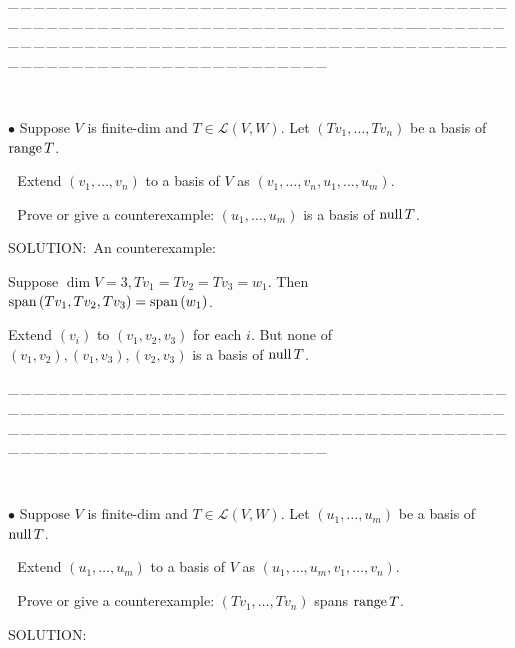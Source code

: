\documentclass[a4paper, 11pt, UTF8]{article}
\def\range{\textup{range}\,}
\def\null{\textup{null\,}}
\def\Spn{\textup{span}\,}
\def\Lm{\mathcal{L}}
\begin{document}
\begin{large}
{\tiny \_\,\_\,\_\,\_\,\_\,\_\,\_\,\_\,\_\,\_\,\_\,\_\,\_\,\_\,\_\,\_\,\_\,\_\,\_\,\_\,\_\,\_\,\_\,\_\,\_\,\_\,\_\,\_\,\_\,\_\,\_\,\_\,\_\,\_\,\_\,\_\,\_\,\_\,\_\,\_\,\_\,\_\,\_\,\_\,\_\,\_\,\_\,\_\,\_\,\_\,\_\,\_\,\_\,\_\,\_\,\_\,\_\,\_\,\_\,\_\,\_\,\_\,\_\,\_\,\_\,\_\,\_\,\_\,\_\,\_\,\_\_\,\_\,\_\,\_\,\_\,\_\,\_\,\_\,\_\,\_\,\_\,\_\,\_\,\_\,\_\,\_\,\_\,\_\,\_\,\_\,\_\,\_\,\_\,\_\,\_\,\_\,\_\,\_\,\_\,\_\,\_\,\_\,\_\,\_\,\_\,\_\,\_\,\_\,\_\,\_\,\_\,\_\,\_\,\_\,\_\,\_\,\_\,\_\,\_\,\_\,\_\,\_\,\_\,\_\,\_\,\_\,\_\,\_\,\_\,\_\,\_\,\_\,\_\,\_\,\_\,\_\,\_\,\_\,\_\,\_\,\_}{\tiny\,\par}
{\small $\bullet$} {\timessl\Large Suppose $V$ is finite-dim and $T\in\Lm(V,W)$. Let $(Tv_1,\dots,Tv_n)$ be a basis of $\range T$.}\par\,\,
{\timessl\Large Extend $(v_1,\dots,v_n)$ to a basis of $V$ as $(v_1,\dots,v_n,u_1,\dots,u_m)$.}\par\,\,
{\timessl\Large Prove or give a counterexample: $(u_1,\dots,u_m)$ is a basis of $\null T$.}\par
{\timesbf S\footnotesize{OLUTION:}}\,\,\,An counterexample:\par\quad
Suppose $\dim V=3, Tv_1=Tv_2=Tv_3=w_1.$ Then $\Spn(Tv_1,Tv_2,Tv_3)=\Spn(w_1)$.\par\quad
Extend $(v_i)$ to $(v_1,v_2,v_3)$ for each $i$. But none of $(v_1,v_2),(v_1,v_3),(v_2,v_3)$ is a basis of $\null T$.\par
{\tiny \_\,\_\,\_\,\_\,\_\,\_\,\_\,\_\,\_\,\_\,\_\,\_\,\_\,\_\,\_\,\_\,\_\,\_\,\_\,\_\,\_\,\_\,\_\,\_\,\_\,\_\,\_\,\_\,\_\,\_\,\_\,\_\,\_\,\_\,\_\,\_\,\_\,\_\,\_\,\_\,\_\,\_\,\_\,\_\,\_\,\_\,\_\,\_\,\_\,\_\,\_\,\_\,\_\,\_\,\_\,\_\,\_\,\_\,\_\,\_\,\_\,\_\,\_\,\_\,\_\,\_\,\_\,\_\,\_\,\_\,\_\_\,\_\,\_\,\_\,\_\,\_\,\_\,\_\,\_\,\_\,\_\,\_\,\_\,\_\,\_\,\_\,\_\,\_\,\_\,\_\,\_\,\_\,\_\,\_\,\_\,\_\,\_\,\_\,\_\,\_\,\_\,\_\,\_\,\_\,\_\,\_\,\_\,\_\,\_\,\_\,\_\,\_\,\_\,\_\,\_\,\_\,\_\,\_\,\_\,\_\,\_\,\_\,\_\,\_\,\_\,\_\,\_\,\_\,\_\,\_\,\_\,\_\,\_\,\_\,\_\,\_\,\_\,\_\,\_\,\_\,\_}{\tiny\,\par}
{\small $\bullet$} {\timessl\Large Suppose $V$ is finite-dim and $T\in\Lm(V,W)$. Let $(u_1,\dots,u_m)$ be a basis of $\null T$.}\par\,\,
{\timessl\Large Extend $(u_1,\dots,u_m)$ to a basis of $V$ as $(u_1,\dots,u_m,v_1,\dots,v_n)$.}\par\,\,
{\timessl\Large Prove or give a counterexample: $(Tv_1,\dots,Tv_n)$ spans $\range T$.}\par
{\timesbf S\footnotesize{OLUTION:}}\par\quad

\end{large}
\end{document}
